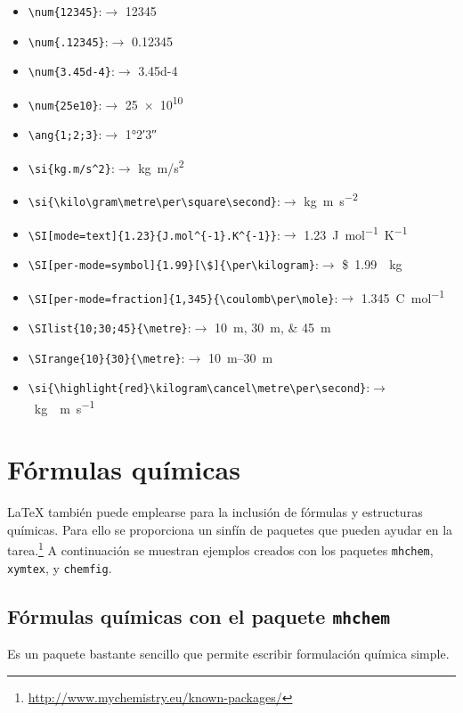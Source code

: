 \documentclass[ 		%
	11pt,				%
	a4paper,			%
	twoside,			%
	openright,			%
	final       		%
]{book}
\begin{document}
\begin{itemize}[noitemsep]
	\item \verb|\num{12345}|:$\rightarrow$ \num{12345}
	\item \verb|\num{.12345}|:$\rightarrow$  \num{.12345}
	\item \verb|\num{3.45d-4}|:$\rightarrow$  \num{3.45d-4}
	\item \verb|\num{25e10}|:$\rightarrow$  \num{25e10}
	\item \verb|\ang{1;2;3}|:$\rightarrow$  \ang{1;2;3}
	\item \verb|\si{kg.m/s^2}|:$\rightarrow$  \si{kg.m/s^2}
	\item \verb|\si{\kilo\gram\metre\per\square\second}|:$\rightarrow$  \si{\kilo\gram\metre\per\square\second}
	\item \verb|\SI[mode=text]{1.23}{J.mol^{-1}.K^{-1}}|:$\rightarrow$  \SI[mode=text]{1.23}{J.mol^{-1}.K^{-1}}
	\item \verb|\SI[per-mode=symbol]{1.99}[\$]{\per\kilogram}|:$\rightarrow$  \SI[per-mode=symbol]{1.99}[\$]{\per\kilogram}
	\item \verb|\SI[per-mode=fraction]{1,345}{\coulomb\per\mole}|:$\rightarrow$  \SI[per-mode=fraction]{1,345}{\coulomb\per\mole}
	\item \verb|\SIlist{10;30;45}{\metre}|:$\rightarrow$  \SIlist{10;30;45}{\metre}
	\item \verb|\SIrange{10}{30}{\metre}|:$\rightarrow$  \SIrange{10}{30}{\metre}
	\item \verb|\si{\highlight{red}\kilogram\cancel\metre\per\second}|:$\rightarrow$  \si{\kilogram\cancel\metre\per\second}
\end{itemize}


\chapter{Fórmulas químicas}
\LaTeX{} también puede emplearse para la inclusión de fórmulas y estructuras químicas. Para ello se proporciona un sinfín de paquetes que pueden ayudar en la tarea.\footnote{\url{http://www.mychemistry.eu/known-packages/}} A continuación se muestran ejemplos creados con los paquetes \texttt{mhchem}, \texttt{xymtex}, y \texttt{chemfig}.



\section{Fórmulas químicas con el paquete \texttt{mhchem}}
Es un paquete bastante sencillo que permite escribir formulación química simple.
\end{document}
